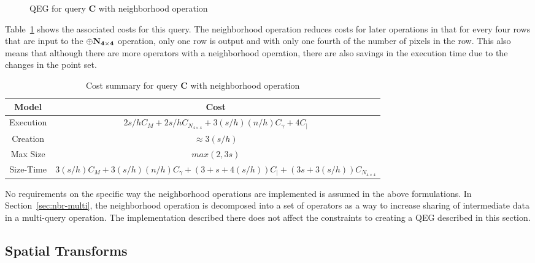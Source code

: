 \documentclass{ucdthesis}       %
\newcommand{\Tb}[2][]{ \TR[#1]{\psframebox{\rule{0pt}{9pt}#2}} }
\newcommand{\qry}[1]{{\bf #1}}
\begin{document}
\begin{figure}[htb]
  \centering
  \pstree[treemode=U,nodesep=2pt,levelsep=30pt]{\TR{Q}}{
    \pstree[treemode=U]{\Tcircle{$f()$}}
    {      
      \pstree[treemode=U]{\Tb{$|_{NA}$}}
      {
        \pstree[treemode=U]{\Tb{$\oplus\pt{N_{4\times4}}$}}
        {
          \pstree[treemode=U]{\Tb{$|_{NA'}$}}{\TR[name=C1]{\im{C1}}}
        }
      }
      \pstree[treemode=U]{\Tb{$|_{NA}$}}
      {
        \pstree[treemode=U]{\Tb{$\oplus\pt{N_{4\times4}}$}}
        {
          \pstree[treemode=U]{\Tb{$|_{NA'}$}}{\TR[name=C1]{\im{C2}}}
        }
      }
    }
  }
  \quad
    
  \caption{\ac{QEG} for query \qry{C} with neighborhood operation}
  \label{fig:qep-c}
\end{figure}

Table~\ref{tab:ndvi-N} shows the associated costs for this query.  The
neighborhood operation reduces costs for later operations in that for
every four rows that are input to the $\oplus {\ensuremath{\bf{N_{4\times 4}}}}$
operation, only one row is output and with only one fourth of the
number of pixels in the row.  This also means that although there are
more operators with a neighborhood operation, there are also savings
in the execution time due to the changes in the point set.
%
\begin{table}
  \centering
  \caption{Cost summary for query \qry{C} with neighborhood operation}
  \begin{tabular}{c|c}
    Model & Cost \\
    \hline \hline
    Execution & $2 s/h C_{M} + 2 s/h C_{N_{4\times 4}} + 3(s/h)(n/h)C_{\gamma} + 4 C_{|}$ \\
    Creation  & $\approx 3(s/h)$ \\
    Max Size  & $max(2,3s)$ \\
    Size-Time & $3(s/h)C_{M} + 3(s/h)(n/h)C_{\gamma} + (3+s+4(s/h))C_{|} + (3s+3(s/h))C_{N_{4\times 4}}$ 
  \end{tabular}
  \label{tab:ndvi-N}
\end{table}

No requirements on the specific way the neighborhood operations are
implemented is assumed in the above formulations.  In
Section~\ref{sec:nbr-multi}, the neighborhood operation is decomposed
into a set of operators as a way to increase sharing of intermediate
data in a multi-query operation.  The implementation described there
does not affect the constraints to creating a \ac{QEG} described in
this section.

\subsection{Spatial Transforms}
\label{sec:trans-op}
\end{document}
